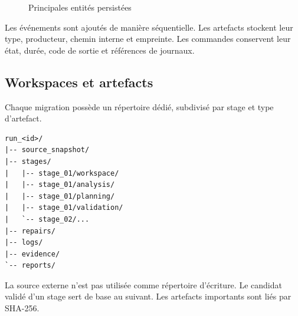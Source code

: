 \begin{figure}[H]
    \centering
    \caption{Principales entités persistées}
    \label{fig:entites-persistantes-ch4}
\end{figure}

Les événements sont ajoutés de manière séquentielle. Les artefacts stockent leur type, producteur, chemin interne et empreinte. Les commandes conservent leur état, durée, code de sortie et références de journaux.

\subsection{Workspaces et artefacts}

Chaque migration possède un répertoire dédié, subdivisé par stage et type d'artefact.

\begin{verbatim}
run_<id>/
|-- source_snapshot/
|-- stages/
|   |-- stage_01/workspace/
|   |-- stage_01/analysis/
|   |-- stage_01/planning/
|   |-- stage_01/validation/
|   `-- stage_02/...
|-- repairs/
|-- logs/
|-- evidence/
`-- reports/
\end{verbatim}

La source externe n'est pas utilisée comme répertoire d'écriture. Le candidat validé d'un stage sert de base au suivant. Les artefacts importants sont liés par SHA-256.

